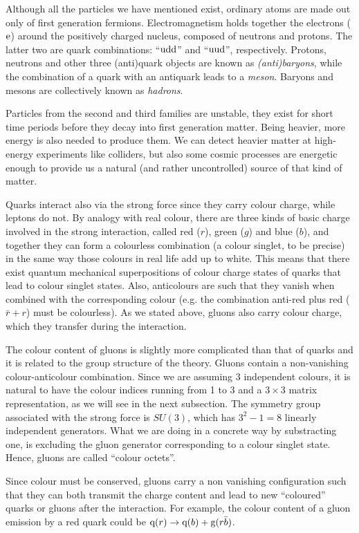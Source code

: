 \documentclass[a4paper,12pt]{article}
\begin{document}
Although all the particles we have mentioned exist, ordinary atoms are made out only of first generation fermions. Electromagnetism holds together the electrons (${\mathrm e}$) around the positively charged nucleus, composed of neutrons and protons. The latter two are quark combinations: ``${\mathrm u}{\mathrm d}{\mathrm d}$'' and ``${\mathrm u}{\mathrm u}{\mathrm d}$'', respectively. Protons, neutrons and other three (anti)quark objects are known as \textit{(anti)baryons}, while the combination of a quark with an antiquark leads to a \textit{meson}. Baryons and mesons are collectively known as \textit{hadrons}.

Particles from the second and third families are unstable, they exist for short time periods before they decay into first generation matter. Being heavier, more energy is also needed to produce them. We can detect heavier matter at high-energy experiments like colliders, but also some cosmic processes are energetic enough to provide us a natural (and rather uncontrolled) source of that kind of matter.

Quarks interact also via the strong force since they carry colour charge, while leptons do not. By analogy with real colour, there are three kinds of basic charge involved in the strong interaction, called red ($r$), green ($g$) and blue ($b$), and together they can form a colourless combination (a colour singlet, to be precise) in the same way those colours in real life add up to white. This means that there exist quantum mechanical superpositions of colour charge states of quarks that lead to colour singlet states. Also, anticolours are such that they vanish when combined with the corresponding colour (e.g. the combination anti-red plus red ($\bar r + r$) must be colourless). As we stated above, gluons also carry colour charge, which they transfer during the interaction.

The colour content of gluons is slightly more complicated than that of quarks and it is related to the group structure of the theory. Gluons contain a non-vanishing colour-anticolour combination. Since we are assuming 3 independent colours, it is natural to have the colour indices running from 1 to 3 and a $3\times 3$ matrix representation, as we will see in the next subsection. The symmetry group associated with the strong force is $SU(3)$, which has $3^2-1=8$ linearly independent generators. What we are doing in a concrete way by substracting one, is excluding the gluon generator corresponding to a colour singlet state. Hence, gluons are called ``colour octets''.

Since colour must be conserved, gluons carry a non vanishing configuration such that they can both transmit the charge content and lead to new ``coloured'' quarks or gluons after the interaction. For example, the colour content of a gluon emission by a red quark could be ${\mathrm q}(r)\to{\mathrm q}(b)+{\mathrm g}(r\bar b)$.
\end{document}
